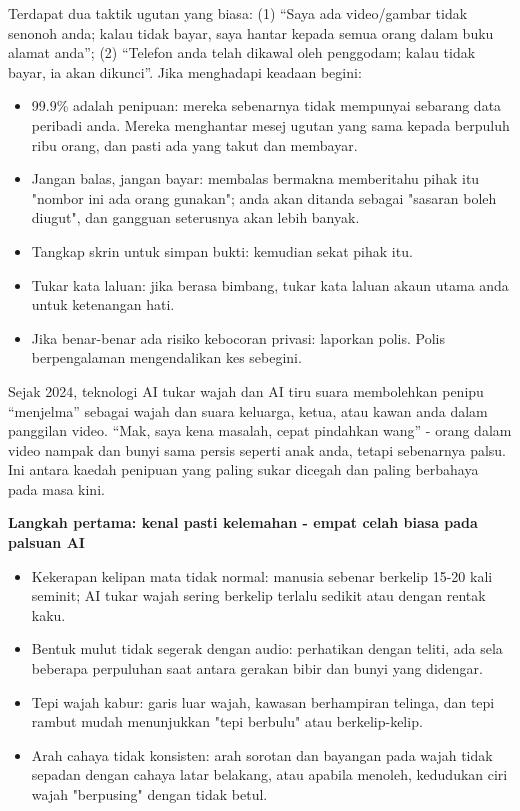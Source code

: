 
Terdapat dua taktik ugutan yang biasa: (1) “Saya ada video/gambar tidak senonoh anda; kalau tidak bayar, saya hantar kepada semua orang dalam buku alamat anda”; (2) “Telefon anda telah dikawal oleh penggodam; kalau tidak bayar, ia akan dikunci”. Jika menghadapi keadaan begini:

\begin{itemize}
  \item 99.9\% adalah penipuan: mereka sebenarnya tidak mempunyai sebarang data peribadi anda. Mereka menghantar mesej ugutan yang sama kepada berpuluh ribu orang, dan pasti ada yang takut dan membayar.
  \item Jangan balas, jangan bayar: membalas bermakna memberitahu pihak itu "nombor ini ada orang gunakan"; anda akan ditanda sebagai "sasaran boleh diugut", dan gangguan seterusnya akan lebih banyak.
  \item Tangkap skrin untuk simpan bukti: kemudian sekat pihak itu.
  \item Tukar kata laluan: jika berasa bimbang, tukar kata laluan akaun utama anda untuk ketenangan hati.
  \item Jika benar-benar ada risiko kebocoran privasi: laporkan polis. Polis berpengalaman mengendalikan kes sebegini.
\end{itemize}


Sejak 2024, teknologi AI tukar wajah dan AI tiru suara membolehkan penipu “menjelma” sebagai wajah dan suara keluarga, ketua, atau kawan anda dalam panggilan video. “Mak, saya kena masalah, cepat pindahkan wang” - orang dalam video nampak dan bunyi sama persis seperti anak anda, tetapi sebenarnya palsu. Ini antara kaedah penipuan yang paling sukar dicegah dan paling berbahaya pada masa kini.

\textbf{Langkah pertama: kenal pasti kelemahan - empat celah biasa pada palsuan AI}\par

\begin{itemize}
  \item Kekerapan kelipan mata tidak normal: manusia sebenar berkelip 15-20 kali seminit; AI tukar wajah sering berkelip terlalu sedikit atau dengan rentak kaku.
  \item Bentuk mulut tidak segerak dengan audio: perhatikan dengan teliti, ada sela beberapa perpuluhan saat antara gerakan bibir dan bunyi yang didengar.
  \item Tepi wajah kabur: garis luar wajah, kawasan berhampiran telinga, dan tepi rambut mudah menunjukkan "tepi berbulu" atau berkelip-kelip.
  \item Arah cahaya tidak konsisten: arah sorotan dan bayangan pada wajah tidak sepadan dengan cahaya latar belakang, atau apabila menoleh, kedudukan ciri wajah "berpusing" dengan tidak betul.
\end{itemize}

